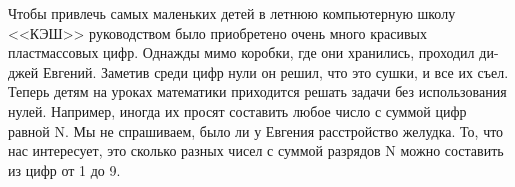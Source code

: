 Чтобы привлечь самых маленьких детей в летнюю компьютерную школу <<КЭШ>> руководством было приобретено очень много красивых пластмассовых цифр. Однажды мимо коробки, где они хранились, проходил ди-джей Евгений. Заметив среди цифр нули он решил, что это сушки, и все их съел. Теперь детям на уроках математики приходится решать задачи без использования нулей. Например, иногда их просят составить любое число с суммой цифр равной N. Мы не спрашиваем, было ли у Евгения расстройство желудка. То, что нас интересует, это сколько разных чисел с суммой разрядов N можно составить из цифр от 1 до 9.